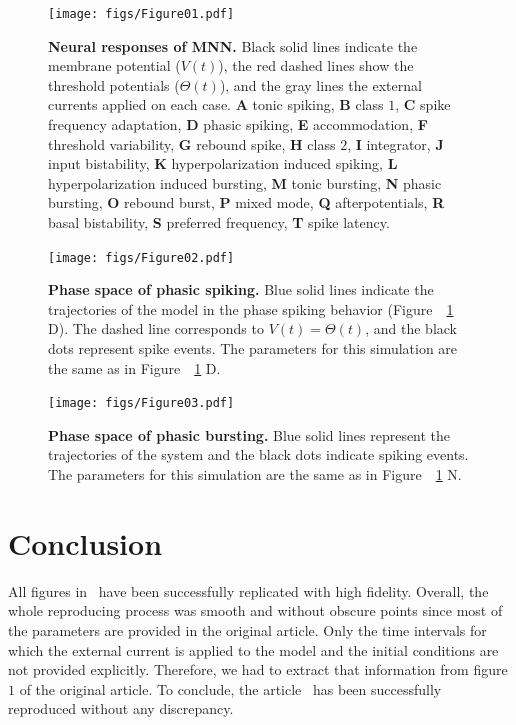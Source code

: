 \documentclass[10pt,a4paper,onecolumn]{article}
\begin{document}
\begin{figure}
\centering
\texttt{[image: figs/Figure01.pdf]}
\caption{\textbf{Neural responses of MNN.} Black solid lines indicate
the membrane potential (\(V(t)\)), the red dashed lines show the
threshold potentials (\(\Theta(t)\)), and the gray lines the external
currents applied on each case. {\textbf{A}} tonic spiking, {\textbf{B}}
class \(1\), {\textbf{C}} spike frequency adaptation, {\textbf{D}}
phasic spiking, {\textbf{E}} accommodation, {\textbf{F}} threshold
variability, {\textbf{G}} rebound spike, {\textbf{H}} class \(2\),
{\textbf{I}} integrator, {\textbf{J}} input bistability, {\textbf{K}}
hyperpolarization induced spiking, {\textbf{L}} hyperpolarization
induced bursting, {\textbf{M}} tonic bursting, {\textbf{N}} phasic
bursting, {\textbf{O}} rebound burst, {\textbf{P}} mixed mode,
{\textbf{Q}} afterpotentials, {\textbf{R}} basal bistability,
{\textbf{S}} preferred frequency, {\textbf{T}} spike
latency.}\label{fig:1}
\end{figure}

\begin{figure}
\centering
\texttt{[image: figs/Figure02.pdf]}
\caption{\textbf{Phase space of phasic spiking.} Blue solid lines
indicate the trajectories of the model in the phase spiking behavior
(Figure~~\ref{fig:1} D). The dashed line corresponds to
\(V(t) =  \Theta(t)\), and the black dots represent spike events. The
parameters for this simulation are the same as in Figure~~\ref{fig:1}
D.}\label{fig:2}
\end{figure}

\begin{figure}
\centering
\texttt{[image: figs/Figure03.pdf]}
\caption{\textbf{Phase space of phasic bursting.} Blue solid lines
represent the trajectories of the system and the black dots indicate
spiking events. The parameters for this simulation are the same as in
Figure~~\ref{fig:1} N.}\label{fig:3}
\end{figure}

\section{Conclusion}\label{conclusion}

All figures in~\textcite{mihalas:2009} have been successfully replicated
with high fidelity. Overall, the whole reproducing process was smooth
and without obscure points since most of the parameters are provided in
the original article. Only the time intervals for which the external
current is applied to the model and the initial conditions are not
provided explicitly. Therefore, we had to extract that information from
figure \(1\) of the original article. To conclude, the
article~\autocite{mihalas:2009} has been successfully reproduced without
any discrepancy.

{\sffamily \small
  \printbibliography[title=References]
}
\end{document}
